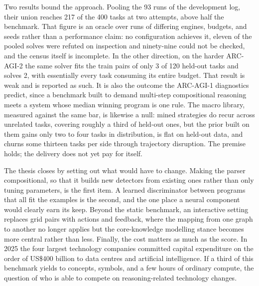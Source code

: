 Two results bound the approach. Pooling the 93 runs of the development log, their union
reaches 217 of the 400 tasks at two attempts, above half the benchmark. That figure is an
oracle over runs of differing engines, budgets, and seeds rather than a performance claim: no
configuration achieves it, eleven of the pooled solves were refuted on inspection and
ninety-nine could not be checked, and the census itself is incomplete. In the
other direction, on the harder ARC-AGI-2 the same solver fits the train pairs of
only 3 of 120 held-out tasks and solves 2, with essentially every task consuming its entire
budget. That result is weak and is reported as such. It is also the outcome the ARC-AGI-1
diagnostics predict, since a benchmark built to demand multi-step compositional reasoning
meets a system whose median winning program is one rule. The macro library, measured against
the same bar, is likewise a null: mined strategies do recur across unrelated tasks, covering
roughly a third of held-out ones, but the prior built on them gains only two to four tasks
in distribution, is flat on held-out data, and churns some thirteen tasks per side through
trajectory disruption. The premise holds; the delivery does not yet pay for itself.

The thesis closes by setting out what would have to change. Making the parser compositional,
so that it builds new detectors from existing ones rather than only tuning parameters, is the
first item. A learned discriminator between programs that all fit the examples is the second,
and the one place a neural component would clearly earn its keep. Beyond the static
benchmark, an interactive setting replaces grid pairs with actions and feedback, where the
mapping from one graph to another no longer applies but the core-knowledge modelling stance
becomes more central rather than less. Finally, the cost matters as much as the score. In 2025 the
four largest technology companies committed capital expenditure on the order of
US\$400 billion to data centres and artificial intelligence. If a third of this benchmark
yields to concepts, symbols, and a few hours of ordinary compute, the question of who is able
to compete on reasoning-related technology changes.
